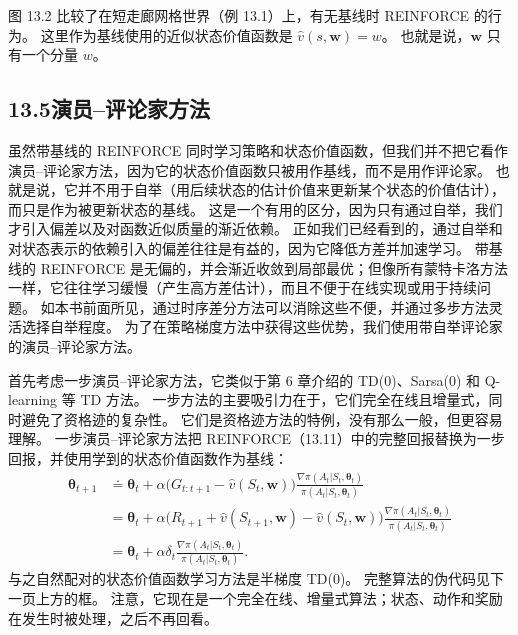 \documentclass[UTF8,12pt,a4paper,fontset=fandol]{ctexart}
\begin{document}
图 13.2 比较了在短走廊网格世界（例 13.1）上，有无基线时 REINFORCE 的行为。
这里作为基线使用的近似状态价值函数是 $\hat v(s,\mathbf{w})=w$。
也就是说，$\mathbf{w}$ 只有一个分量 $w$。

\subsection*{13.5\quad 演员--评论家方法}

虽然带基线的 REINFORCE 同时学习策略和状态价值函数，但我们并不把它看作演员--评论家方法，因为它的状态价值函数只被用作基线，而不是用作评论家。
也就是说，它并不用于自举（用后续状态的估计价值来更新某个状态的价值估计），而只是作为被更新状态的基线。
这是一个有用的区分，因为只有通过自举，我们才引入偏差以及对函数近似质量的渐近依赖。
正如我们已经看到的，通过自举和对状态表示的依赖引入的偏差往往是有益的，因为它降低方差并加速学习。
带基线的 REINFORCE 是无偏的，并会渐近收敛到局部最优；但像所有蒙特卡洛方法一样，它往往学习缓慢（产生高方差估计），而且不便于在线实现或用于持续问题。
如本书前面所见，通过时序差分方法可以消除这些不便，并通过多步方法灵活选择自举程度。
为了在策略梯度方法中获得这些优势，我们使用带自举评论家的演员--评论家方法。

首先考虑一步演员--评论家方法，它类似于第 6 章介绍的 TD(0)、Sarsa(0) 和 Q-learning 等 TD 方法。
一步方法的主要吸引力在于，它们完全在线且增量式，同时避免了资格迹的复杂性。
它们是资格迹方法的特例，没有那么一般，但更容易理解。
一步演员--评论家方法把 REINFORCE（13.11）中的完整回报替换为一步回报，并使用学到的状态价值函数作为基线：
\begin{align}
\boldsymbol{\theta}_{t+1}
&\doteq \boldsymbol{\theta}_t+\alpha\bigl(G_{t:t+1}-\hat v(S_t,\mathbf{w})\bigr)
\frac{\nabla\pi(A_t|S_t,\boldsymbol{\theta}_t)}{\pi(A_t|S_t,\boldsymbol{\theta}_t)}
\tag{13.12}\\
&=\boldsymbol{\theta}_t+\alpha\bigl(R_{t+1}+\hat v(S_{t+1},\mathbf{w})-\hat v(S_t,\mathbf{w})\bigr)
\frac{\nabla\pi(A_t|S_t,\boldsymbol{\theta}_t)}{\pi(A_t|S_t,\boldsymbol{\theta}_t)}
\tag{13.13}\\
&=\boldsymbol{\theta}_t+\alpha\delta_t
\frac{\nabla\pi(A_t|S_t,\boldsymbol{\theta}_t)}{\pi(A_t|S_t,\boldsymbol{\theta}_t)}.
\tag{13.14}
\end{align}
与之自然配对的状态价值函数学习方法是半梯度 TD(0)。
完整算法的伪代码见下一页上方的框。
注意，它现在是一个完全在线、增量式算法；状态、动作和奖励在发生时被处理，之后不再回看。
\end{document}
